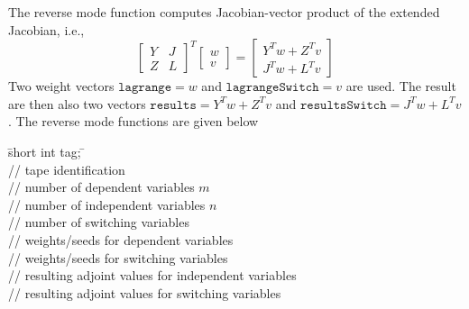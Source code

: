 The reverse mode function computes Jacobian-vector product of the extended
Jacobian, i.e., 
\[ \left[\begin{array}{cc}
            Y & J\\ Z & L
         \end{array}\right]^T 
         \left[\begin{array}{cc}
            w\\ v
         \end{array}\right] =
         \left[\begin{array}{cc}
          Y^Tw + Z^Tv \\J^Tw + L^Tv
         \end{array}\right]
         \] 
Two weight vectors $\texttt{lagrange} = w$ and $\texttt{lagrangeSwitch} = v$
are used. The result are then also two vectors 
$\texttt{results} = Y^Tw + Z^Tv$ and
$\texttt{resultsSwitch} = J^Tw + L^Tv$.
The reverse mode functions are given below
\begin{tabbing}
\hspace{0.5in}\={\sf short int tag;} \hspace{1.1in}\= \kill    %
\\
         \> // tape identification \\
                 \> // number of dependent variables $m$\\
                 \> // number of independent variables $n$\\
                 \> // number of switching variables\\
    \> // weights/seeds for dependent variables \\
 \> // weights/seeds for switching variables \\
     \> // resulting adjoint values for independent variables\\
 \> // resulting adjoint values for switching variables \\
\end{tabbing}


